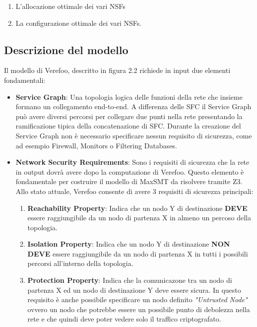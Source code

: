 \begin{enumerate}
    \item L'allocazione ottimale dei vari NSFs
    \item La configurazione ottimale dei vari NSFs.
\end{enumerate}

\subsection{Descrizione del modello}
Il modello di Verefoo, descritto in figura 2.2 richiede in input due elementi fondamentali:

\begin{itemize}
    \item \textbf{Service Graph}: Una topologia logica delle funzioni della rete che insieme formano un collegamento end-to-end. A differenza delle SFC il Service Graph può avere diversi percorsi per collegare due punti nella rete
    presentando la ramificazione tipica della concatenazione di SFC. Durante la creazione del Service Graph non è necessario specificare nessun requisito di sicurezza, come ad esempio Firewall, Monitors o Filtering Databases. 
    \item \textbf{Network Security Requirements}: Sono i requisiti di sicurezza che la rete in output dovrà avere dopo la computazione di Verefoo. Questo elemento è fondamentale per costruire il modello di MaxSMT da risolvere tramite Z3.
    Allo stato attuale, Verefoo consente di avere 3 requisiti di sicurezza principali:
        \begin{enumerate}
            \item \textbf{Reachability Property}: Indica che un nodo Y di destinazione \textbf{DEVE} essere raggiungibile da un nodo di partenza X in almeno un percoso della topologia.
            \item \textbf{Isolation Property}: Indica che un nodo Y di destinazione \textbf{NON DEVE} essere raggiungibile da un nodo di partenza X in tutti i possibili percorsi all'interno della topologia.
            \item \textbf{Protection Property}: Indica che la comunicazone tra un nodo di partenza X ed un nodo di destinazione Y deve essere sicura. In questo requisito è anche possibile specificare
                un nodo definito \textit{"Untrusted Node"} ovvero un nodo che potrebbe essere un possibile punto di debolezza nella rete e che quindi deve poter vedere solo il traffico criptografato.
        \end{enumerate}
\end{itemize}


